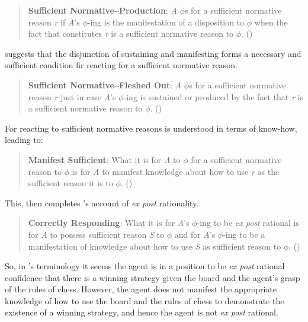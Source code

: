 \documentclass[10pt]{article}
\begin{document}
\begin{quote}
  \textbf{Sufficient Normative–Production}: \emph{A} \(\phi\)s for a sufficient normative reason \emph{r} if \emph{A}'s \(\phi\)-ing is the manifestation of a disposition to \(\phi\) when the fact that constitutes \emph{r} is a sufficient normative reason to \(\phi\).\nolinebreak
  \mbox{}\hfill\mbox{(\citeyear[142]{Lord:2018aa})}
\end{quote}

\citeauthor{Lord:2018aa} suggests that the disjunction of sustaining and manifesting forms a necessary and sufficient condition fir reacting for a sufficient normative reason.

\begin{quote}
  \textbf{Sufficient Normative–Fleshed Out}: \emph{A} \(\phi\)s for a sufficient normative reason \emph{r} just in case \emph{A}'s \(\phi\)-ing is sustained or produced by the fact that \emph{r} is a sufficient normative reason to \(\phi\).\nolinebreak
  \mbox{}\hfill\mbox{(\citeyear[143]{Lord:2018aa})}
\end{quote}

For \citeauthor{Lord:2018aa} reacting to sufficient normative reasons is understood in terms of know-how, leading to:

\begin{quote}
  \textbf{Manifest Sufficient}: What it is for \emph{A} to \(\phi\) for a sufficient normative reason to \(\phi\) is for \emph{A} to manifest knowledge about how to use \emph{r} as the sufficient reason it is to \(\phi\).\nolinebreak
  \mbox{}\hfill\mbox{(\citeyear[143]{Lord:2018aa})}
\end{quote}

This, then completes \citeauthor{Lord:2018aa}'s account of \emph{ex post} rationality.

\begin{quote}
  \textbf{Correctly Responding}: What it is for \emph{A}'s \(\phi\)-ing to be \emph{ex post} rational is for \emph{A} to possess sufficient reason \emph{S} to \(\phi\) and for \emph{A}'s \(\phi\)-ing to be a manifestation of knowledge about how to use \emph{S} as sufficient reason to \(\phi\).\nolinebreak
  \mbox{}\hfill\mbox{(\citeyear[143]{Lord:2018aa})}
\end{quote}

So, in \citeauthor{Lord:2018aa}'s terminology it seems the agent is in a position to be \emph{ex post} rational confidence that there is a winning strategy given the board and the agent's grasp of the rules of chess.
However, the agent does not manifest the appropriate knowledge of how to use the board and the rules of chess to demonstrate the existence of a winning strategy, and hence the agent is not \emph{ex post} rational.
\end{document}
